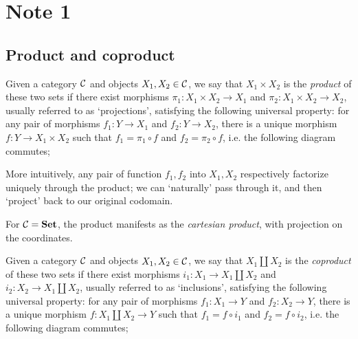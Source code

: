 
\section{Note 1}

\subsection{Product and coproduct}

\begin{definition}[Product]
	Given a category $\mathcal{C}$ and objects $X_1,X_2\in\mathcal{C}$, we say that $X_1\times X_2$ is the \emph{product} of these two sets if there exist morphisms $\pi_1:X_1\times X_2 \to X_1$ and $\pi_2:X_1\times X_2\to X_2$, usually referred to as `projections', satisfying the following universal property: for any pair of morphisms $f_1:Y\to X_1$ and $f_2:Y\to X_2$, there is a unique morphism $f:Y\to X_1\times X_2$ such that $f_1=\pi_1 \circ f$ and $f_2=\pi_2 \circ f$, i.e. the following diagram commutes;

	\begin{figure}[!ht]
	\centering
	\end{figure}
\end{definition}

More intuitively, any pair of function $f_1,f_2$ into $X_1,X_2$ respectively factorize uniquely through the product; we can `naturally' pass through it, and then `project' back to our original codomain.

For $\mathcal{C}=\mathbf{Set}$, the product manifests as the \emph{cartesian product}, with projection on the coordinates.

\begin{definition}[Coproduct]
	Given a category $\mathcal{C}$ and objects $X_1,X_2\in\mathcal{C}$, we say that $X_1\coprod X_2$ is the \emph{coproduct} of these two sets if there exist morphisms $i_1:X_1\to X_1\coprod X_2$ and $i_2:X_2\to X_1\coprod X_2$, usually referred to as `inclusions', satisfying the following universal property: for any pair of morphisms $f_1:X_1\to Y$ and $f_2:X_2\to Y$, there is a unique morphism $f:X_1\coprod X_2\to Y$ such that $f_1=f\circ i_1$ and $f_2=f\circ i_2$, i.e. the following diagram commutes;

	\begin{figure}[ht!]
	\centering
	\end{figure}
\end{definition}

